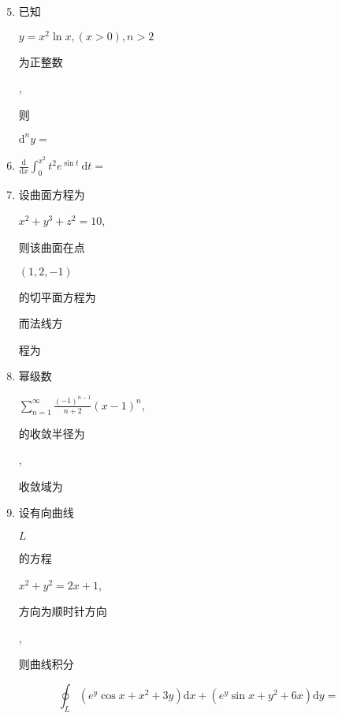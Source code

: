 \documentclass[10pt]{article}
\begin{document}
\begin{enumerate}
  \setcounter{enumi}{4}
  \item \begin{CJK}{UTF8}{mj}已知\end{CJK} $y=x^{2} \ln x,(x>0), n>2$ \begin{CJK}{UTF8}{mj}为正整数\end{CJK}, \begin{CJK}{UTF8}{mj}则\end{CJK} $\mathrm{d}^{n} y=$

  \item $\frac{\mathrm{d}}{\mathrm{d} x} \int_{0}^{x^{2}} t^{2} e^{\sin t} \mathrm{~d} t=$

  \item \begin{CJK}{UTF8}{mj}设曲面方程为\end{CJK} $x^{2}+y^{3}+z^{2}=10$, \begin{CJK}{UTF8}{mj}则该曲面在点\end{CJK} $(1,2,-1)$ \begin{CJK}{UTF8}{mj}的切平面方程为\end{CJK} \begin{CJK}{UTF8}{mj}而法线方\end{CJK} \begin{CJK}{UTF8}{mj}程为\end{CJK}

  \item \begin{CJK}{UTF8}{mj}幂级数\end{CJK} $\sum_{n=1}^{\infty} \frac{(-1)^{n-1}}{n+2}(x-1)^{n}$, \begin{CJK}{UTF8}{mj}的收敛半径为\end{CJK} , \begin{CJK}{UTF8}{mj}收敛域为\end{CJK}

  \item \begin{CJK}{UTF8}{mj}设有向曲线\end{CJK} $L$ \begin{CJK}{UTF8}{mj}的方程\end{CJK} $x^{2}+y^{2}=2 x+1$, \begin{CJK}{UTF8}{mj}方向为顺时针方向\end{CJK}, \begin{CJK}{UTF8}{mj}则曲线积分\end{CJK}

\end{enumerate}
$$
\oint_{L}\left(e^{y} \cos x+x^{2}+3 y\right) \mathrm{d} x+\left(e^{y} \sin x+y^{2}+6 x\right) \mathrm{d} y=
$$
\end{document}
